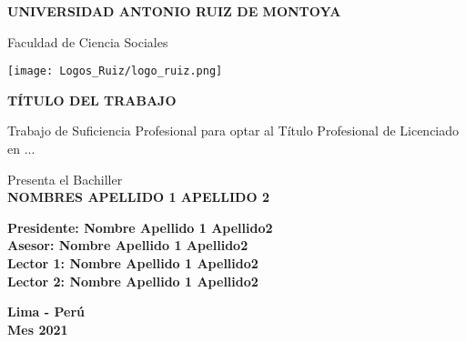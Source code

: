 \thispagestyle{empty} %
	\begin{center}
		
	\textbf{\large UNIVERSIDAD ANTONIO RUIZ DE MONTOYA}
	
	\vspace{1cm}
	Faculdad de Ciencia Sociales
	
	\vspace{1cm}
	
	\texttt{[image: Logos\_Ruiz/logo\_ruiz.png]}
	
	\vspace{1cm}
	
	\textbf{\large TÍTULO DEL TRABAJO}
	
	\vspace{1cm}
	
	Trabajo de Suficiencia Profesional para optar al Título Profesional de Licenciado en ...
	
	\vspace{1.cm}
	
	\hspace{-11cm}Presenta el Bachiller\\
	\vspace{1cm}
	\textbf{\large NOMBRES APELLIDO 1 APELLIDO 2}
	
	\vspace{1cm}
	
	\textbf{Presidente: Nombre Apellido 1 Apellido2\\
		Asesor: Nombre Apellido 1 Apellido2\\
		Lector 1: Nombre Apellido 1 Apellido2\\
		Lector 2: Nombre Apellido 1 Apellido2}
	
	\vspace{2.5cm}
	
	\textbf{Lima - Perú \\ Mes 2021}
\end{center}